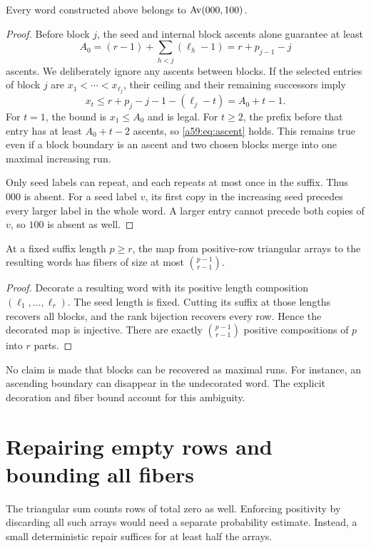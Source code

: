 \documentclass[11pt,letterpaper]{article}
\theoremstyle{remark}\newtheorem{remark}[theorem]{Remark}
\theoremstyle{remark}\newtheorem{wremark}{Remark}\renewcommand{\thewremark}{W\arabic{wremark}}
\theoremstyle{plain}\newtheorem{wcorollary}[wremark]{Corollary}
\begin{document}
\begin{lemma}\label{a59:lem:legalpositive}
Every word constructed above belongs to $\operatorname{Av}(000,100)$.
\end{lemma}
\begin{proof}
Before block $j$, the seed and internal block ascents alone guarantee at least
\[
 A_0=(r-1)+\sum_{h<j}(\ell_h-1)=r+p_{j-1}-j
\]
ascents. We deliberately ignore any ascents between blocks. If the selected entries of block $j$ are $x_1<\cdots<x_{\ell_j}$, their ceiling and their remaining successors imply
\[
 x_t\le r+p_j-j-1-(\ell_j-t)=A_0+t-1.
\]
For $t=1$, the bound is $x_1\le A_0$ and is legal. For $t\ge2$, the prefix before that entry has at least $A_0+t-2$ ascents, so \eqref{a59:eq:ascent} holds. This remains true even if a block boundary is an ascent and two chosen blocks merge into one maximal increasing run.

Only seed labels can repeat, and each repeats at most once in the suffix. Thus $000$ is absent. For a seed label $v$, its first copy in the increasing seed precedes every larger label in the whole word. A larger entry cannot precede both copies of $v$, so $100$ is absent as well.
\end{proof}

\begin{lemma}\label{a59:lem:blockfiber}
At a fixed suffix length $p\ge r$, the map from positive-row triangular arrays to the resulting words has fibers of size at most $\binom{p-1}{r-1}$.
\end{lemma}
\begin{proof}
Decorate a resulting word with its positive length composition $(\ell_1,\ldots,\ell_r)$. The seed length is fixed. Cutting its suffix at those lengths recovers all blocks, and the rank bijection recovers every row. Hence the decorated map is injective. There are exactly $\binom{p-1}{r-1}$ positive compositions of $p$ into $r$ parts.
\end{proof}
No claim is made that blocks can be recovered as maximal runs. For instance, an ascending boundary can disappear in the undecorated word. The explicit decoration and fiber bound account for this ambiguity.
\section{Repairing empty rows and bounding all fibers}\label{a59:sec:repair}
The triangular sum counts rows of total zero as well. Enforcing positivity by discarding all such arrays would need a separate probability estimate. Instead, a small deterministic repair suffices for at least half the arrays.
\end{document}
